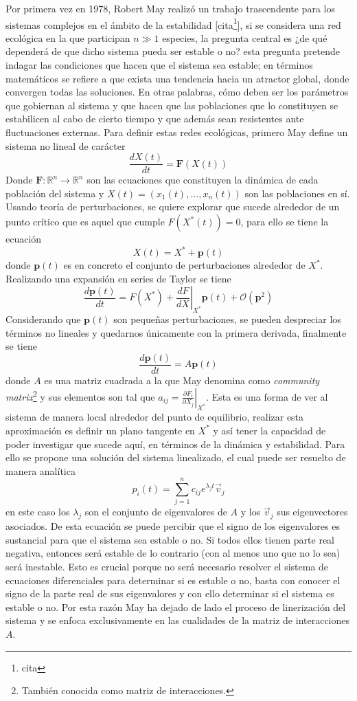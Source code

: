 Por primera vez en 1978, Robert May realizó un trabajo trascendente para los sistemas complejos en el ámbito de la estabilidad [cita\footnote{cita}], si se considera una red ecológica en la que participan $n\gg 1$ especies, la pregunta central es ¿de qué dependerá de que dicho sistema pueda ser estable o no? esta pregunta pretende indagar las condiciones que hacen que el sistema sea estable; en términos matemáticos se refiere a que exista una tendencia hacia un atractor global, donde convergen todas las soluciones. En otras palabras, cómo deben ser los parámetros que gobiernan al sistema y que hacen que las poblaciones que lo constituyen se estabilicen al cabo de cierto tiempo y que además sean resistentes ante fluctuaciones externas. Para definir estas redes ecológicas, primero May define un sistema no lineal de carácter
$$\frac{dX(t)}{dt}=\textbf{F}(X(t))$$
Donde $\textbf{F}:\mathbb{R}^n\to\mathbb{R}^n$ son las ecuaciones que constituyen la dinámica de cada población del sistema y $X(t)=(x_1(t),...,x_n(t))$ son las poblaciones en sí. Usando teoría de perturbaciones, se quiere explorar que sucede alrededor de un punto crítico que es aquel que cumple $F(X^*(t))=0$, para ello se tiene la ecuación
$$X(t)=X ^*+\textbf{p}(t)$$
donde $\textbf{p}(t)$ es en concreto el conjunto de perturbaciones alrededor de $X^*$. Realizando una expansión en series de Taylor se tiene 
$$\frac{d\textbf{p}(t)}{dt}=F(X^*)+\left .\frac{dF}{dX}\right  |_{X^*}\textbf{p}(t)+\mathcal{O}(\textbf{p}^2)$$
Considerando que $\textbf{p}(t)$ son pequeñas perturbaciones, se pueden despreciar los términos no lineales y quedarnos únicamente con la primera derivada, finalmente se tiene 
$$\frac{d\textbf{p}(t)}{dt}=A\textbf{p}(t)$$
donde $A$ es una matriz cuadrada a la que May denomina como \textit{community matrix}\footnote{También conocida como matriz de interacciones.} y sus elementos son tal que $a_{ij}=\left .\frac{\partial F_i}{\partial X_j}\right |_{X^*}$. Esta es una forma de ver al sistema de manera local alrededor del punto de equilibrio, realizar esta aproximación es definir un plano tangente en $X^*$ y así tener la capacidad de poder investigar que sucede aquí, en términos de la dinámica y estabilidad. Para ello se propone una solución del sistema linealizado, el cual puede ser resuelto de manera analítica
$$p_i(t)=\sum_{j=1}^n c_{ij}e^{\lambda_{j}t}\vec{v}_j$$
en este caso los $\lambda_{j}$ son el conjunto de eigenvalores de $A$ y los $\vec{v}_j$ sus eigenvectores asociados. De esta ecuación se puede percibir que el signo de los eigenvalores es sustancial para que el sistema sea estable o no. Si todos ellos tienen parte real negativa, entonces será estable de lo contrario (con al menos uno que no lo sea) será inestable. Esto es crucial porque no será necesario resolver el sistema de ecuaciones diferenciales para determinar si es estable o no, basta con conocer el signo de la parte real de sus eigenvalores y con ello determinar si el sistema es estable o no. Por esta razón May ha dejado de lado el proceso de linerización del sistema y se enfoca exclusivamente en las cualidades de la matriz de interacciones $A$.
